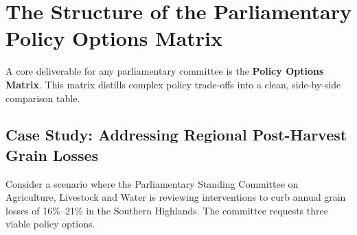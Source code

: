 \documentclass[11pt, a4paper]{report}
\begin{document}
\newpage

\section{The Structure of the Parliamentary Policy Options Matrix}
A core deliverable for any parliamentary committee is the \textcolor{tanzaniablue}{\textbf{Policy Options Matrix}}. This matrix distills complex policy trade-offs into a clean, side-by-side comparison table.

\subsection{Case Study: Addressing Regional Post-Harvest Grain Losses}
Consider a scenario where the Parliamentary Standing Committee on Agriculture, Livestock and Water is reviewing interventions to curb annual grain losses of 16\%--21\% in the Southern Highlands. The committee requests three viable policy options.
\end{document}
